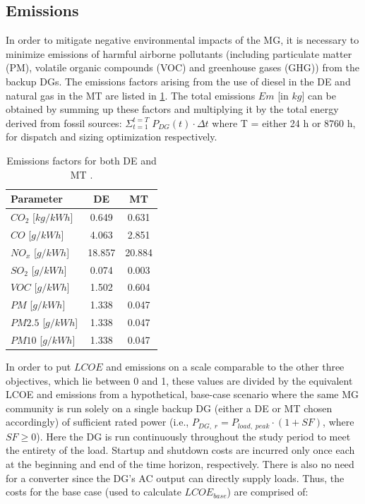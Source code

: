 \documentclass[final,3p,times]{elsarticle}
\begin{document}
\subsection{Emissions \label{sec:norm}}
In order to mitigate negative environmental impacts of the MG, it is necessary to minimize emissions of harmful airborne pollutants (including particulate matter (PM), volatile organic compounds (VOC) and greenhouse gases (GHG)) from the backup DGs. The emissions factors arising from the use of diesel in the DE and natural gas in the MT are listed in \cref{tab:emissions}. The total emissions $Em$ [in $kg$] can be obtained by summing up these factors and multiplying it by the total energy derived from fossil sources: $\Sigma_{t=1}^{t=T} \; P_{DG}(t) \cdot \Delta t$ where T = either 24 h or 8760 h, for dispatch and sizing optimization respectively.

\begin{table}[htbp]
\centering
\begin{tabular}{@{}lcc@{}}
\toprule
\textbf{Parameter} & DE & MT \\ 
\midrule
$CO_2$ [$kg/kWh$] & 0.649 \cite{wu2016} & 0.631 \cite{chp_mt} \\
$CO$ [$g/kWh$] & 4.063 & 2.851\\
$NO_x$ [$g/kWh$] & 18.857 & 20.884\\
$SO_2$ [$g/kWh$] & 0.074 & 0.003\\
$VOC$ [$g/kWh$] & 1.502 & 0.604\\
$PM$ [$g/kWh$] & 1.338 & 0.047\\
$PM2.5$ [$g/kWh$] & 1.338 & 0.047\\
$PM10$ [$g/kWh$] & 1.338 & 0.047\\
\bottomrule
\end{tabular}
\caption{Emissions factors for both DE and MT \cite{emissions}.}
\label{tab:emissions}
\end{table}

In order to put $LCOE$ and emissions on a scale comparable to the other three objectives, which lie between 0 and 1, these values are divided by the equivalent LCOE and emissions from a hypothetical, base-case scenario where the same MG community is run solely on a single backup DG (either a DE or MT chosen accordingly) of sufficient rated power (i.e., $P_{DG,\;r} = P_{load,\; peak} \cdot (1+SF)$, where $SF \geq 0$). Here the DG is run continuously throughout the study period to meet the entirety of the load. Startup and shutdown costs are incurred only once each at the beginning and end of the time horizon, respectively. There is also no need for a converter since the DG's AC output can directly supply loads. Thus, the costs for the base case (used to calculate $LCOE_{base}$) are comprised of:
\end{document}
